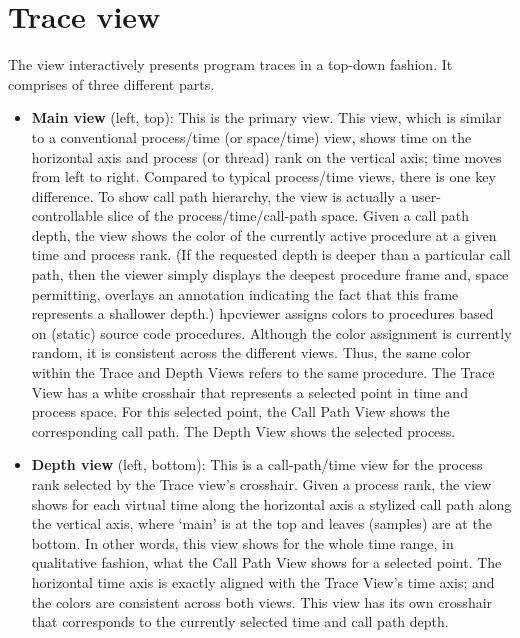 \documentclass[english]{article}
\begin{document}


\section{Trace view}

The view interactively presents program traces in a top-down fashion. 
It comprises of three different parts. 


\begin{itemize}
\item \textbf{Main view} (left, top):
  This is the primary view.
  This view, which is similar to a conventional process/time (or space/time) view, shows time on the horizontal axis and process (or thread) rank on the vertical axis; time moves from left to right.
  Compared to typical process/time views, there is one key difference.
  To show call path hierarchy, the view is actually a user-controllable slice of the process/time/call-path space.
  Given a call path depth, the view shows the color of the currently active procedure at a given time and process rank.
  (If the requested depth is deeper than a particular call path, then the viewer simply displays the deepest procedure frame and, space permitting, overlays an annotation indicating the fact that this frame represents a shallower depth.)
  hpcviewer assigns colors to procedures based on (static) source code procedures.
  Although the color assignment is currently random, it is consistent across the different views.
  Thus, the same color within the Trace and Depth Views refers to the same procedure.
  The Trace View has a white crosshair that represents a selected point in time and process space.
  For this selected point, the Call Path View shows the corresponding call path.
  The Depth View shows the selected process.

\item \textbf{Depth view} (left, bottom):
  This is a call-path/time view for the process rank selected by the Trace view's crosshair.
  Given a process rank, the view shows for each virtual time along the horizontal axis a stylized call path along the vertical axis, where `main' is at the top and leaves (samples) are at the bottom.
  In other words, this view shows for the whole time range, in qualitative fashion, what the Call Path View shows for a selected point.
  The horizontal time axis is exactly aligned with the Trace View's time axis; and the colors are consistent across both views.
  This view has its own crosshair that corresponds to the currently selected time and call path depth.


\end{itemize}
\end{document}
